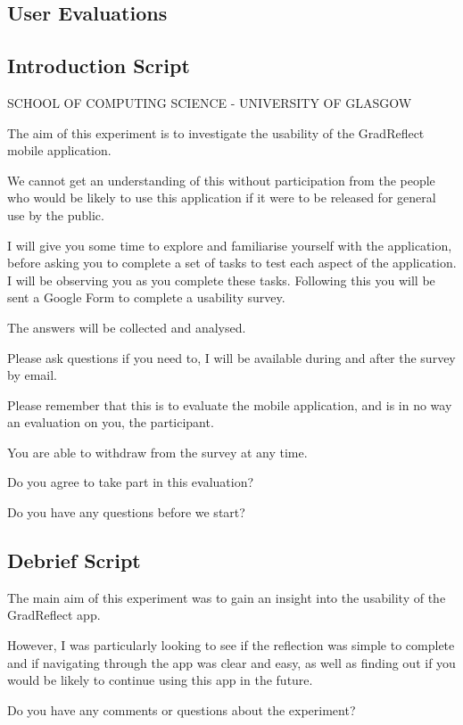 \documentclass{l4proj}
\begin{document}
\begin{appendices}
\section{User Evaluations} \label{Appendix-UserEvals}

\subsection{Introduction Script}

SCHOOL OF COMPUTING SCIENCE - UNIVERSITY OF GLASGOW

The aim of this experiment is to investigate the usability of the GradReflect mobile application.

We cannot get an understanding of this without participation from the people who would be likely to use this application if it were to be released for general use by the public.

I will give you some time to explore and familiarise yourself with the application, before asking you to complete a set of tasks to test each aspect of the application. I will be observing you as you complete these tasks. Following this you will be sent a Google Form to complete a usability survey.

The answers will be collected and analysed.

Please ask questions if you need to, I will be available during and after the survey by email.

Please remember that this is to evaluate the mobile application, and is in no way an evaluation on you, the participant.

You are able to withdraw from the survey at any time.

Do you agree to take part in this evaluation?

Do you have any questions before we start?


\subsection{Debrief Script}

The main aim of this experiment was to gain an insight into the usability of the GradReflect app.

However, I was particularly looking to see if the reflection was simple to complete and if navigating through the app was clear and easy, as well as finding out if you would be likely to continue using this app in the future.

Do you have any comments or questions about the experiment?


\end{appendices}
\end{document}
